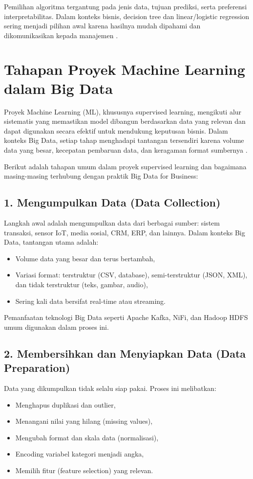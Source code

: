 Pemilihan algoritma tergantung pada jenis data, tujuan prediksi, serta preferensi interpretabilitas.  
Dalam konteks bisnis, decision tree dan linear/logistic regression sering menjadi pilihan awal karena hasilnya mudah dipahami dan dikomunikasikan kepada manajemen \cite{provost2013data}.


\section{Tahapan Proyek Machine Learning dalam Big Data}

Proyek Machine Learning (ML), khususnya supervised learning, mengikuti alur sistematis yang memastikan model dibangun berdasarkan data yang relevan dan dapat digunakan secara efektif untuk mendukung keputusan bisnis. Dalam konteks Big Data, setiap tahap menghadapi tantangan tersendiri karena volume data yang besar, kecepatan pembaruan data, dan keragaman format sumbernya \cite{chen2012,wamba2017}.

Berikut adalah tahapan umum dalam proyek supervised learning dan bagaimana masing-masing terhubung dengan praktik Big Data for Business:

\subsection*{1. Mengumpulkan Data (Data Collection)}

Langkah awal adalah mengumpulkan data dari berbagai sumber: sistem transaksi, sensor IoT, media sosial, CRM, ERP, dan lainnya. Dalam konteks Big Data, tantangan utama adalah:
\begin{itemize}
	\item Volume data yang besar dan terus bertambah,
	\item Variasi format: terstruktur (CSV, database), semi-terstruktur (JSON, XML), dan tidak terstruktur (teks, gambar, audio),
	\item Sering kali data bersifat real-time atau streaming.
\end{itemize}

Pemanfaatan teknologi Big Data seperti Apache Kafka, NiFi, dan Hadoop HDFS umum digunakan dalam proses ini.

\subsection*{2. Membersihkan dan Menyiapkan Data (Data Preparation)}

Data yang dikumpulkan tidak selalu siap pakai. Proses ini melibatkan:
\begin{itemize}
	\item Menghapus duplikasi dan outlier,
	\item Menangani nilai yang hilang (missing values),
	\item Mengubah format dan skala data (normalisasi),
	\item Encoding variabel kategori menjadi angka,
	\item Memilih fitur (feature selection) yang relevan.
\end{itemize}

